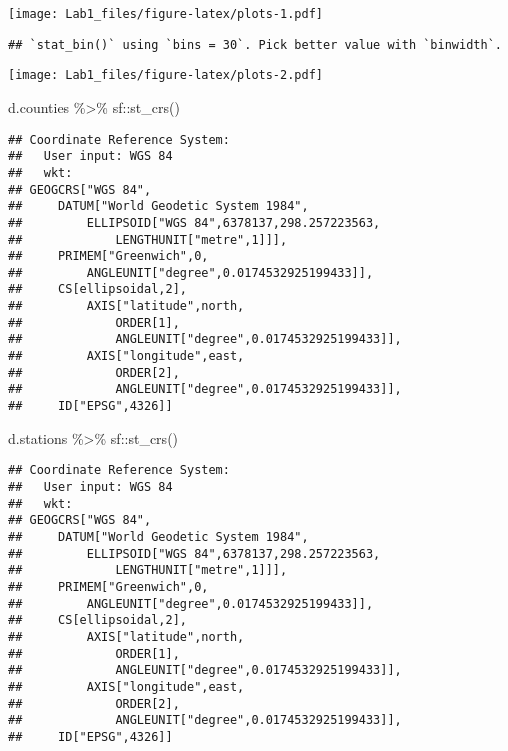 \documentclass[
]{article}
\newenvironment{Shaded}{\begin{snugshade}}{\end{snugshade}}
\newcommand{\FunctionTok}[1]{\textcolor[rgb]{0.00,0.00,0.00}{#1}}
\newcommand{\NormalTok}[1]{#1}
\newcommand{\SpecialCharTok}[1]{\textcolor[rgb]{0.00,0.00,0.00}{#1}}
\begin{document}
\texttt{[image: Lab1\_files/figure-latex/plots-1.pdf]}

\begin{verbatim}
## `stat_bin()` using `bins = 30`. Pick better value with `binwidth`.
\end{verbatim}

\texttt{[image: Lab1\_files/figure-latex/plots-2.pdf]}

\begin{Shaded}
\begin{Highlighting}[]
\NormalTok{d.counties }\SpecialCharTok{\%\textgreater{}\%}\NormalTok{ sf}\SpecialCharTok{::}\FunctionTok{st\_crs}\NormalTok{()}
\end{Highlighting}
\end{Shaded}

\begin{verbatim}
## Coordinate Reference System:
##   User input: WGS 84 
##   wkt:
## GEOGCRS["WGS 84",
##     DATUM["World Geodetic System 1984",
##         ELLIPSOID["WGS 84",6378137,298.257223563,
##             LENGTHUNIT["metre",1]]],
##     PRIMEM["Greenwich",0,
##         ANGLEUNIT["degree",0.0174532925199433]],
##     CS[ellipsoidal,2],
##         AXIS["latitude",north,
##             ORDER[1],
##             ANGLEUNIT["degree",0.0174532925199433]],
##         AXIS["longitude",east,
##             ORDER[2],
##             ANGLEUNIT["degree",0.0174532925199433]],
##     ID["EPSG",4326]]
\end{verbatim}

\begin{Shaded}
\begin{Highlighting}[]
\NormalTok{d.stations }\SpecialCharTok{\%\textgreater{}\%}\NormalTok{ sf}\SpecialCharTok{::}\FunctionTok{st\_crs}\NormalTok{() }
\end{Highlighting}
\end{Shaded}

\begin{verbatim}
## Coordinate Reference System:
##   User input: WGS 84 
##   wkt:
## GEOGCRS["WGS 84",
##     DATUM["World Geodetic System 1984",
##         ELLIPSOID["WGS 84",6378137,298.257223563,
##             LENGTHUNIT["metre",1]]],
##     PRIMEM["Greenwich",0,
##         ANGLEUNIT["degree",0.0174532925199433]],
##     CS[ellipsoidal,2],
##         AXIS["latitude",north,
##             ORDER[1],
##             ANGLEUNIT["degree",0.0174532925199433]],
##         AXIS["longitude",east,
##             ORDER[2],
##             ANGLEUNIT["degree",0.0174532925199433]],
##     ID["EPSG",4326]]
\end{verbatim}
\end{document}
